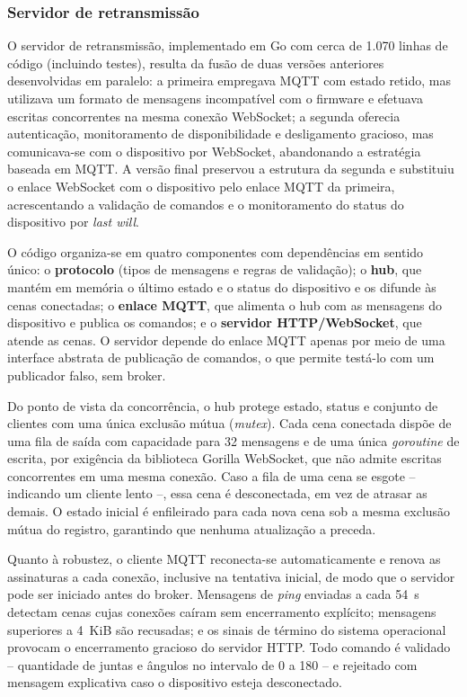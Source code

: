 \documentclass[12pt]{article}
\begin{document}
\subsubsection{Servidor de retransmissão}
\label{subsec:relay}

O servidor de retransmissão, implementado em Go com cerca de 1.070 linhas de código (incluindo testes), resulta da fusão de duas versões anteriores desenvolvidas em paralelo: a primeira empregava MQTT com estado retido, mas utilizava um formato de mensagens incompatível com o firmware e efetuava escritas concorrentes na mesma conexão WebSocket; a segunda oferecia autenticação, monitoramento de disponibilidade e desligamento gracioso, mas comunicava-se com o dispositivo por WebSocket, abandonando a estratégia baseada em MQTT. A versão final preservou a estrutura da segunda e substituiu o enlace WebSocket com o dispositivo pelo enlace MQTT da primeira, acrescentando a validação de comandos e o monitoramento do status do dispositivo por \textit{last will}.

O código organiza-se em quatro componentes com dependências em sentido único: o \textbf{protocolo} (tipos de mensagens e regras de validação); o \textbf{hub}, que mantém em memória o último estado e o status do dispositivo e os difunde às cenas conectadas; o \textbf{enlace MQTT}, que alimenta o hub com as mensagens do dispositivo e publica os comandos; e o \textbf{servidor HTTP/WebSocket}, que atende as cenas. O servidor depende do enlace MQTT apenas por meio de uma interface abstrata de publicação de comandos, o que permite testá-lo com um publicador falso, sem broker.

Do ponto de vista da concorrência, o hub protege estado, status e conjunto de clientes com uma única exclusão mútua (\textit{mutex}). Cada cena conectada dispõe de uma fila de saída com capacidade para 32 mensagens e de uma única \textit{goroutine} de escrita, por exigência da biblioteca Gorilla WebSocket, que não admite escritas concorrentes em uma mesma conexão. Caso a fila de uma cena se esgote -- indicando um cliente lento --, essa cena é desconectada, em vez de atrasar as demais. O estado inicial é enfileirado para cada nova cena sob a mesma exclusão mútua do registro, garantindo que nenhuma atualização a preceda.

Quanto à robustez, o cliente MQTT reconecta-se automaticamente e renova as assinaturas a cada conexão, inclusive na tentativa inicial, de modo que o servidor pode ser iniciado antes do broker. Mensagens de \textit{ping} enviadas a cada 54~s detectam cenas cujas conexões caíram sem encerramento explícito; mensagens superiores a 4~KiB são recusadas; e os sinais de término do sistema operacional provocam o encerramento gracioso do servidor HTTP. Todo comando é validado -- quantidade de juntas e ângulos no intervalo de 0\textdegree{} a 180\textdegree{} -- e rejeitado com mensagem explicativa caso o dispositivo esteja desconectado.
\end{document}
